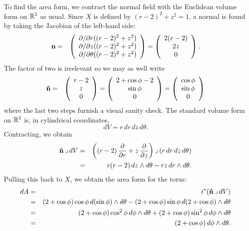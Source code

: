 \documentclass[10pt]{article}
\numberwithin{equation}{subsection}
\begin{document}
To find the area form, we contract the normal field with the Euclidean volume
form on $\mathbb{R}^3$ as usual.  Since $X$ is defined by $(r-2)^2+z^2=1$, a normal is
found by taking the Jacobian of the left-hand side:
\begin{eqnarray*}
	\mathbf{n} &=& \left(\begin{array}{cccccccccccc} 
		\partial/\partial r((r-2)^2+z^2) \\
		\partial/\partial z((r-2)^2+z^2) \\
		\partial/\partial \theta((r-2)^2+z^2)
	 \end{array}\right)
	= \left(\begin{array}{cccccccccccc} 
		2(r-2) \\
		2z \\
		0
	 \end{array}\right).
\end{eqnarray*}
The factor of two is irrelevant so we may as well write
\begin{eqnarray*}
	\mathbf{\hat{n}}
	&=& \left(\begin{array}{cccccccccccc} 
		r-2 \\
		z \\
		0
	 \end{array}\right)
	= \left(\begin{array}{cccccccccccc} 
		2+\cos\phi-2 \\
		\sin\phi \\
		0
	 \end{array}\right)
	= \left(\begin{array}{cccccccccccc} 
		\cos\phi \\
		\sin\phi \\
		0
	 \end{array}\right)
\end{eqnarray*}
where the last two steps furnish a visual sanity check.  The standard volume
form on $\mathbb{R}^3$ is, in cylindrical coordinates,
$$
	dV = r \,dr\,dz\,d\theta.
$$
Contracting, we obtain
\begin{eqnarray*}
	\mathbf{\hat{n}} \,\lrcorner\, dV
	&=& \left((r-2)\,\frac{\partial}{\partial r} + z\,\frac{\partial}{\partial z} \right)
		\,\lrcorner\, (r \,dr\,dz\,d\theta) \\
	&=& r(r-2)\,dz\wedge d\theta - rz\,dr\wedge d\theta.
\end{eqnarray*}
Pulling this back to $X$, we obtain the area form for the torus:
\begin{eqnarray*}
	dA &=& i^*(\mathbf{\hat{n}} \,\lrcorner\, dV) \\
	&=& (2+\cos\phi)\cos\phi \,d(\sin\phi) \wedge d\theta
		- (2+\cos\phi) \sin\phi \,d(2+\cos\phi) \wedge d\theta \\
	&=& (2+\cos\phi)\cos^2\phi \,d\phi \wedge d\theta
		+ (2+\cos\phi) \sin^2\phi \,d\phi \wedge d\theta \\
	&=& (2+\cos\phi) \,d\phi \wedge d\theta.
\end{eqnarray*}
\end{document}
